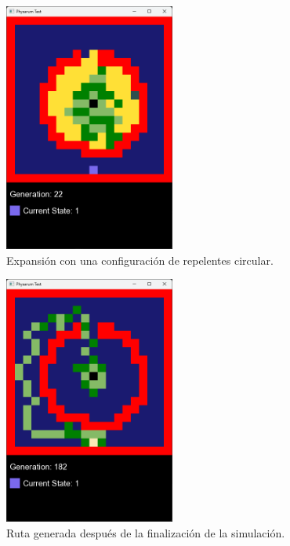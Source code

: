     \begin{figure}[htbp]
        \centering
        \includegraphics[width=0.5\textwidth]{./images/Pruebas/simulador/image073.png}
        \caption{Expansi\'on con una configuraci\'on de repelentes circular.}
        \label{fig:Ruta 73}
    \end{figure}
    \vskip 0.5cm
    \begin{figure}[htbp]
        \centering
        \includegraphics[width=0.5\textwidth]{./images/Pruebas/simulador/image075.png}
        \caption{Ruta generada despu\'es de la finalizaci\'on de la simulaci\'on.}
        \label{fig:Ruta 75}
    \end{figure}
    \clearpage